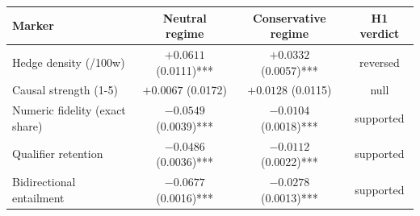\begin{tabular}{lccc}
\toprule
Marker & Neutral regime & Conservative regime & H1 verdict \\
\midrule
Hedge density (/100w) & $+0.0611$ (0.0111)*** & $+0.0332$ (0.0057)*** & reversed \\
Causal strength (1-5) & $+0.0067$ (0.0172) & $+0.0128$ (0.0115) & null \\
Numeric fidelity (exact share) & $-0.0549$ (0.0039)*** & $-0.0104$ (0.0018)*** & supported \\
Qualifier retention & $-0.0486$ (0.0036)*** & $-0.0112$ (0.0022)*** & supported \\
Bidirectional entailment & $-0.0677$ (0.0016)*** & $-0.0278$ (0.0013)*** & supported \\
\bottomrule
\end{tabular}
